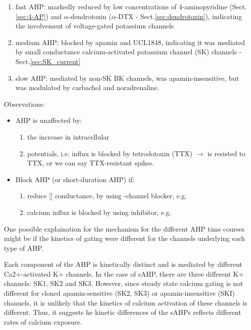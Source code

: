 

\begin{enumerate}
  \item fast AHP:   markedly reduced by low concentrations of 4-aminopyridine
  (Sect.\ref{sec:4-AP}) and $\alpha$-dendrotoxin ($\alpha$-DTX -
  Sect.\ref{sec:dendrotoxin}), indicating the involvement of voltage-gated
  potassium channels 

  \item medium AHP: blocked by apamin and UCL1848, indicating it
was mediated by small conductance calcium-activated potassium
channel (SK) channels - Sect.\ref{sec:SK_current}

  \item slow AHP: mediated by non-SK BK channels, was apamin-insensitive, but
  was modulated by carbachol and noradrenaline.
\end{enumerate} 

Observations:
\begin{itemize}
\item AHP is unaffected by:
  \begin{enumerate}
  \item the increase in intracellular 
  
  \item {} potentials, i.e.  influx is blocked by
    tetrodotoxin (TTX) $\rightarrow$  is resisted to TTX, or
    we can say TTX-resistant  spikes.
  \end{enumerate}
  
\item Block AHP (or short-duration AHP) if:

  \begin{enumerate}
  \item reduce [] conductance, by using -channel
    blocker, e.g. 

  \item calcium influx is blocked by using  inhibitor,
    e.g. 
  \end{enumerate}
\end{itemize}

One possible explaination for the mechanism for the different AHP time courses
might be if the kinetics of gating were different for the channels underlying
each type of AHP. 

Each component of the AHP is kinetically distinct and is mediated by different
Ca2+-activated K+ channels. In the case of sAHP, there are three different K+
channels: SK1, SK2 and SK3. However, since steady state calcium gating is not
different for cloned apamin-sensitive (SK2, SK3) or apamin-insensitive (SKI)
channels, it is unlikely that the kinetics of calcium activation of these
channels is different.
Thus, it suggests he kinetic differences of the sAHPs reflects different rates
of calcium exposure.
 
